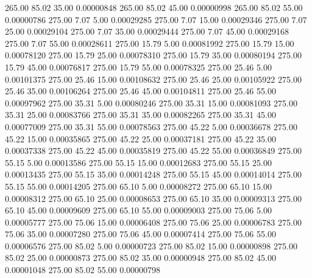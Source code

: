     265.00     85.02     35.00     0.00000848
    265.00     85.02     45.00     0.00000998
    265.00     85.02     55.00     0.00000786
    275.00      7.07      5.00     0.00029285
    275.00      7.07     15.00     0.00029346
    275.00      7.07     25.00     0.00029104
    275.00      7.07     35.00     0.00029444
    275.00      7.07     45.00     0.00029168
    275.00      7.07     55.00     0.00028611
    275.00     15.79      5.00     0.00081992
    275.00     15.79     15.00     0.00078120
    275.00     15.79     25.00     0.00078310
    275.00     15.79     35.00     0.00080194
    275.00     15.79     45.00     0.00076817
    275.00     15.79     55.00     0.00078325
    275.00     25.46      5.00     0.00101375
    275.00     25.46     15.00     0.00108632
    275.00     25.46     25.00     0.00105922
    275.00     25.46     35.00     0.00106264
    275.00     25.46     45.00     0.00104811
    275.00     25.46     55.00     0.00097962
    275.00     35.31      5.00     0.00080246
    275.00     35.31     15.00     0.00081093
    275.00     35.31     25.00     0.00083766
    275.00     35.31     35.00     0.00082265
    275.00     35.31     45.00     0.00077009
    275.00     35.31     55.00     0.00078563
    275.00     45.22      5.00     0.00036678
    275.00     45.22     15.00     0.00035865
    275.00     45.22     25.00     0.00037181
    275.00     45.22     35.00     0.00037338
    275.00     45.22     45.00     0.00035819
    275.00     45.22     55.00     0.00036849
    275.00     55.15      5.00     0.00013586
    275.00     55.15     15.00     0.00012683
    275.00     55.15     25.00     0.00013435
    275.00     55.15     35.00     0.00014248
    275.00     55.15     45.00     0.00014014
    275.00     55.15     55.00     0.00014205
    275.00     65.10      5.00     0.00008272
    275.00     65.10     15.00     0.00008312
    275.00     65.10     25.00     0.00008653
    275.00     65.10     35.00     0.00009313
    275.00     65.10     45.00     0.00009609
    275.00     65.10     55.00     0.00009003
    275.00     75.06      5.00     0.00005777
    275.00     75.06     15.00     0.00006408
    275.00     75.06     25.00     0.00006783
    275.00     75.06     35.00     0.00007280
    275.00     75.06     45.00     0.00007414
    275.00     75.06     55.00     0.00006576
    275.00     85.02      5.00     0.00000723
    275.00     85.02     15.00     0.00000898
    275.00     85.02     25.00     0.00000873
    275.00     85.02     35.00     0.00000948
    275.00     85.02     45.00     0.00001048
    275.00     85.02     55.00     0.00000798
